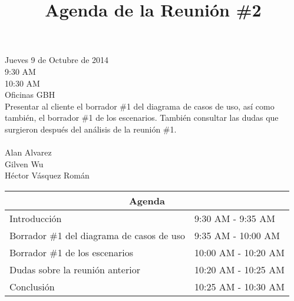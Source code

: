 \documentclass{article}
\begin{document}
\title{\bfseries Agenda de la Reuni\'{o}n \#2}
\date{}
\maketitle

 Jueves 9 de Octubre de 2014\\
 9:30 AM\\
 10:30 AM\\
 Oficinas GBH\\[0.3in]
 Presentar al cliente el borrador \#1 del diagrama de casos de uso, as\'{i} como tambi\'{e}n, el borrador \#1 de los
escenarios. Tambi\'{e}n consultar las dudas que surgieron despu\'{e}s del an\'{a}lisis de la reuni\'{o}n \#1.\\[0.3in]
\\
\indent Alan Alvarez\\
\indent Gilven Wu\\
\indent H\'{e}ctor V\'{a}squez Rom\'{a}n\\[0.3in]    
\begin{center}
    \begin{tabular}{|l|l|}
        \hline
        \multicolumn{2}{|c|}{\bfseries Agenda}\\
        \hline
        Introducci\'{o}n&9:30 AM - 9:35 AM\\
        \hline
        Borrador \#1 del diagrama de casos de uso&9:35 AM - 10:00 AM\\
        \hline
        Borrador \#1 de los escenarios&10:00 AM - 10:20 AM\\
        \hline
        Dudas sobre la reuni\'{o}n anterior&10:20 AM - 10:25 AM\\
        \hline
        Conclusi\'{o}n&10:25 AM - 10:30 AM\\
        \hline
    \end{tabular}
\end{center}
\end{document}
